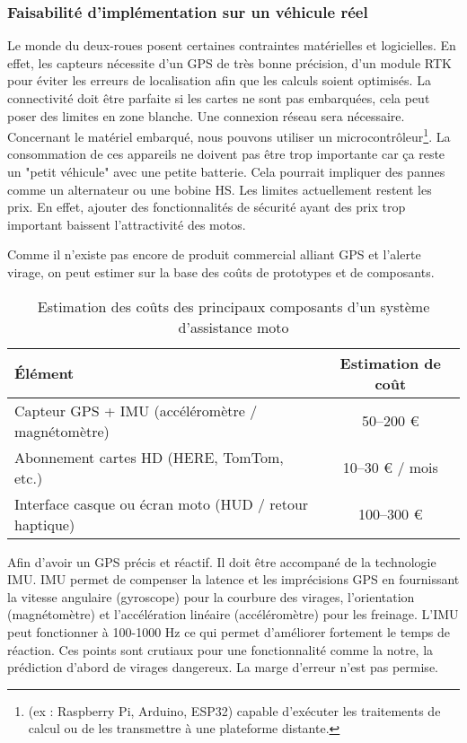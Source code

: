 \subsubsection{Faisabilité d’implémentation sur un véhicule réel}
Le monde du deux-roues posent certaines contraintes matérielles et logicielles. En effet, les capteurs nécessite d’un GPS de très bonne précision, d'un module RTK pour éviter les erreurs de localisation afin que les calculs soient optimisés. La connectivité doit être parfaite si les cartes ne sont pas embarquées, cela peut poser des limites en zone blanche. Une connexion réseau sera nécessaire. Concernant le matériel embarqué, nous pouvons utiliser un  microcontrôleur\footnote{ (ex : Raspberry Pi, Arduino, ESP32) capable d’exécuter les traitements de calcul ou de les transmettre à une plateforme distante.}. La consommation de ces appareils ne doivent pas être trop importante car ça reste un "petit véhicule" avec une petite batterie. Cela pourrait impliquer des pannes comme un alternateur ou une bobine HS.
Les limites actuellement restent les prix. En effet, ajouter des fonctionnalités de sécurité ayant des prix trop important baissent l'attractivité des motos. 

Comme il n’existe pas encore de produit commercial alliant GPS et l'alerte virage, on peut estimer sur la base des coûts de prototypes et de composants.\\

\begin{table}[h!]
\centering
\begin{tabular}{|p{7cm}|c|}
\hline
\textbf{Élément} & \textbf{Estimation de coût} \\
\hline
Capteur GPS + IMU (accéléromètre / magnétomètre) & 50–200 € \\
Abonnement cartes HD (HERE, TomTom, etc.) & 10–30 € / mois \\
Interface casque ou écran moto (HUD / retour haptique) & 100–300 € \\
\hline
\end{tabular}
\caption{Estimation des coûts des principaux composants d'un système d’assistance moto}
\label{tab:couts-composants}
\end{table}


\vspace{0.5cm}
Afin d'avoir un GPS précis et réactif. Il doit être accompané de la technologie IMU. IMU permet de compenser la latence et les imprécisions GPS en fournissant la vitesse angulaire (gyroscope) pour la courbure des virages, l'orientation (magnétomètre) et l'accélération linéaire (accéléromètre) pour les freinage. L'IMU peut fonctionner à 100-1000 Hz ce qui permet d'améliorer fortement le temps de réaction. Ces points sont crutiaux pour une fonctionnalité comme la notre, la prédiction d'abord de virages dangereux. La marge d'erreur n'est pas permise.

